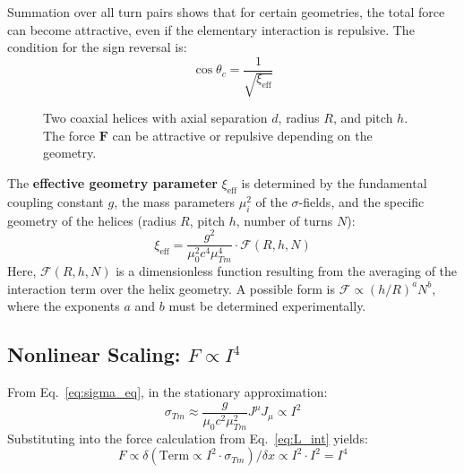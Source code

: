 	Summation over all turn pairs shows that for certain geometries, the total force can become attractive, even if the elementary interaction is repulsive. The condition for the sign reversal is:
	\begin{equation}
		\cos\theta_c = \frac{1}{\sqrt{\xi_{\text{eff}}}} \label{eq:critical_angle}
	\end{equation}
	
	\begin{figure}[h]
		\centering
		\caption{Two coaxial helices with axial separation $d$, radius $R$, and pitch $h$. The force $\mathbf{F}$ can be attractive or repulsive depending on the geometry.}
		\label{fig:helices}
	\end{figure}
	
	The \textbf{effective geometry parameter} $\xi_{\text{eff}}$ is determined by the fundamental coupling constant $g$, the mass parameters $\mu_i^2$ of the $\sigma$-fields, and the specific geometry of the helices (radius $R$, pitch $h$, number of turns $N$):
	\begin{equation}
		\xi_{\text{eff}} = \frac{g^2}{\mu_0^2 c^4 \mu_{Tm}^4} \cdot \mathcal{F}(R, h, N) \label{eq:xi_effective}
	\end{equation}
	Here, $\mathcal{F}(R, h, N)$ is a dimensionless function resulting from the averaging of the interaction term over the helix geometry. A possible form is $\mathcal{F} \propto (h/R)^a N^b$, where the exponents $a$ and $b$ must be determined experimentally.
	
	\subsection{Nonlinear Scaling: $F \propto I^4$}
	From Eq.~\ref{eq:sigma_eq}, in the stationary approximation:
	\begin{equation}
		\sigma_{Tm} \approx \frac{g}{\mu_0 c^2 \mu_{Tm}^2} J^\mu J_\mu \propto I^2
	\end{equation}
	Substituting into the force calculation from Eq.~\ref{eq:L_int} yields:
	\begin{equation}
		F \propto \delta\left(\text{Term} \propto I^2 \cdot \sigma_{Tm}\right)/\delta x \propto I^2 \cdot I^2 = I^4 \label{eq:I4_scaling}
	\end{equation}
	
